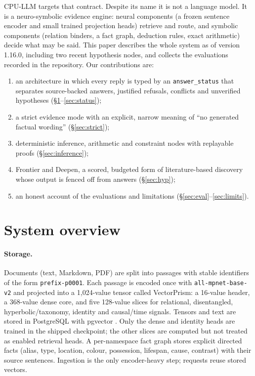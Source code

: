 \documentclass[11pt]{article}
\begin{document}
CPU-LLM targets that contract. Despite its name it is not a language model. It is a neuro-symbolic
\cite{garcez2020neurosymbolic} evidence engine: neural components (a frozen sentence encoder and small trained
projection heads) retrieve and route, and symbolic components (relation binders, a fact graph, deduction rules,
exact arithmetic) decide what may be said. This paper describes the whole system as of version 1.16.0, including
two recent hypothesis nodes, and collects the evaluations recorded in the repository. Our contributions are:

\begin{enumerate}
  \item an architecture in which every reply is typed by an \texttt{answer\_status} that separates source-backed
        answers, justified refusals, conflicts and unverified hypotheses (\S\ref{sec:arch}--\ref{sec:status});
  \item a strict evidence mode with an explicit, narrow meaning of ``no generated factual wording''
        (\S\ref{sec:strict});
  \item deterministic inference, arithmetic and constraint nodes with replayable proofs (\S\ref{sec:inference});
  \item Frontier and Deepen, a scored, budgeted form of literature-based discovery whose output is fenced off from
        answers (\S\ref{sec:hyp});
  \item an honest account of the evaluations and limitations (\S\ref{sec:eval}--\ref{sec:limits}).
\end{enumerate}

\section{System overview}
\label{sec:arch}

\paragraph{Storage.} Documents (text, Markdown, PDF) are split into passages with stable identifiers of the form
\texttt{prefix-p0001}. Each passage is encoded once with \texttt{all-mpnet-base-v2} \cite{reimers2019sbert} and
projected into a 1{,}024-value tensor called VectorPrism: a 16-value header, a 368-value dense core, and five
128-value slices for relational, disentangled, hyperbolic/taxonomy, identity and causal/time signals. Tensors and
text are stored in PostgreSQL with pgvector \cite{pgvector}. Only the dense and identity heads are trained in the
shipped checkpoint; the other slices are computed but not treated as enabled retrieval heads. A per-namespace fact
graph stores explicit directed facts (alias, type, location, colour, possession, lifespan, cause, contrast) with
their source sentences. Ingestion is the only encoder-heavy step; requests reuse stored vectors.
\end{document}
